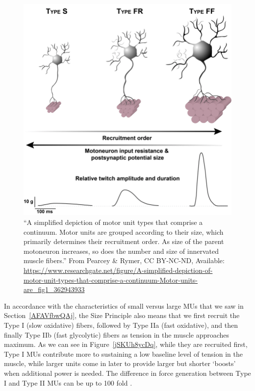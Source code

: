\documentclass{article}
\begin{document}
\begin{figure}[!htbp]
\centering
\includegraphics[width=0.7\linewidth]{files/EPpXta8zJdzN048lz8AR-0d4b04daf13968f2c348204e34c11d3e.png}
\caption[]{``A simplified depiction of motor unit types that comprise a continuum. Motor units are grouped according to their size, which primarily determines their recruitment order. As size of the parent motoneuron increases, so does the number and size of innervated muscle fibers.'' From Pearcey \& Rymer, CC BY-NC-ND, Available: \href{https://www.researchgate.net/figure/A-simplified-depiction-of-motor-unit-types-that-comprise-a-continuum-Motor-units-are\_fig1\_362943933}{https://www.researchgate.net/figure/A-simplified-depiction-of-motor-unit-types-that-comprise-a-continuum-Motor-units-are\_fig1\_362943933}}
\label{d88kUpTUVw}
\end{figure}

In accordance with the characteristics of small versus large MUs that we saw in Section~\ref{AFAVfbwQAj}, the Size Principle also means that we first recruit the Type I (slow oxidative) fibers, followed by Type IIa (fast oxidative), and then finally Type IIb (fast glycolytic) fibers as tension in the muscle approaches maximum. As we can see in Figure~\ref{jSKUh8ycDq}, while they are recruited first, Type I MUs contribute more to sustaining a low baseline level of tension in the muscle, while larger units come in later to provide larger but shorter `boosts' when additional power is needed. The difference in force generation between Type I and Type II MUs can be up to 100 fold \citep{Weinberger2010}.
\end{document}
